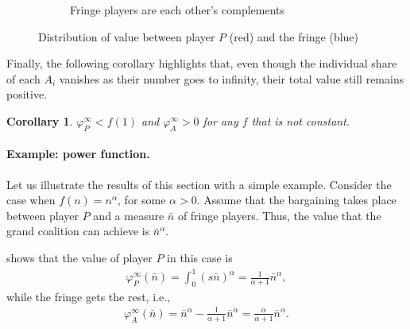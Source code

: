 \documentclass[a4paper]{article}
\newtheorem{corollary}{Corollary}
\begin{document}
\begin{figure}
\begin{subfigure}[b]{0.45\textwidth}
        \caption{Fringe players are each other's complements}
    \end{subfigure}
    \caption{Distribution of value between player $P$ (red) and the fringe (blue)}
    \label{fig:one_sided}
\end{figure}

Finally, the following corollary highlights that, even though the individual share of each $A_i$ vanishes as their number goes to infinity, their total value still remains positive.
\begin{corollary}
    \label{cor:fringe_value_2}
    $\varphi_P^\infty < f(1)$ and $\varphi_A^\infty > 0$ for any $f$ that is not constant.
\end{corollary}


\paragraph{Example: power function.}
\label{sec:power_function_example}

Let us illustrate the results of this section with a simple example.
Consider the case when $f(n) = n^\alpha$, for some $\alpha > 0$.
Assume that the bargaining takes place between player $P$ and a measure $\bar{n}$ of fringe players.
Thus, the value that the grand coalition can achieve is $\bar{n}^\alpha$.

 shows that the value of player $P$ in this case is
\begin{align*}
    \varphi_P^\infty(\bar{n}) = \int_0^1 (s \bar{n})^\alpha = \frac{1}{\alpha + 1} \bar{n}^\alpha,
\end{align*}
while the fringe gets the rest, i.e.,
\begin{align*}
    \varphi_A^\infty(\bar{n}) = \bar{n}^\alpha - \frac{1}{\alpha + 1} \bar{n}^\alpha = \frac{\alpha}{\alpha + 1} \bar{n}^\alpha.
\end{align*}
\end{document}
